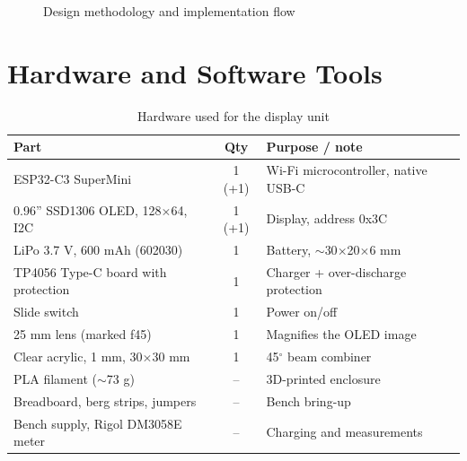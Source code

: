 \documentclass[12pt,a4paper]{report}
\begin{document}
\begin{figure}[H]
\centering
{}
\caption{Design methodology and implementation flow}
\label{fig:workflow}
\end{figure}

\section{Hardware and Software Tools}

\begin{table}[H]
\centering
\caption{Hardware used for the display unit}
\label{tab:hw}
\begin{tabularx}{\linewidth}{L{5.2cm} c X}
\toprule
\textbf{Part} & \textbf{Qty} & \textbf{Purpose / note} \\
\midrule
ESP32-C3 SuperMini & 1 (+1) & Wi-Fi microcontroller, native USB-C \\
0.96'' SSD1306 OLED, 128$\times$64, I2C & 1 (+1) & Display, address 0x3C \\
LiPo 3.7 V, 600 mAh (602030) & 1 & Battery, $\sim$30$\times$20$\times$6 mm \\
TP4056 Type-C board with protection & 1 & Charger + over-discharge protection \\
Slide switch & 1 & Power on/off \\
25 mm lens (marked f45) & 1 & Magnifies the OLED image \\
Clear acrylic, 1 mm, 30$\times$30 mm & 1 & 45$^\circ$ beam combiner \\
PLA filament ($\sim$73 g) & -- & 3D-printed enclosure \\
Breadboard, berg strips, jumpers & -- & Bench bring-up \\
Bench supply, Rigol DM3058E meter & -- & Charging and measurements \\
\bottomrule
\end{tabularx}
\end{table}
\end{document}
